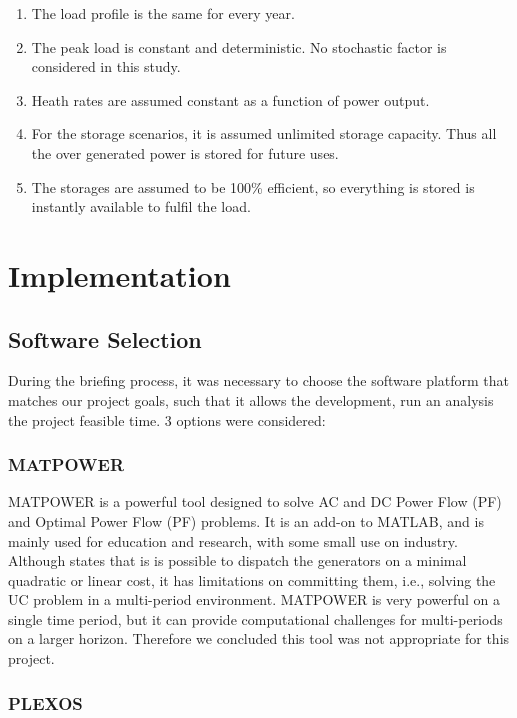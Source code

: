 \documentclass[12pt,LUDisStyle,twosided]{book}
\begin{document}
\begin{enumerate}
\item The load profile is the same for every year.
\item The peak load is constant and deterministic. No stochastic factor is considered in this study.
\item Heath rates are assumed constant as a function of power output.
\item For the storage scenarios, it is assumed unlimited storage capacity. Thus all the over generated power is stored for future uses.
\item The storages are assumed to be 100\% efficient, so everything is stored is instantly available to fulfil the load.
\end{enumerate}

\section{Implementation}


\subsection{Software Selection}

During the briefing process, it was necessary to choose the software platform that matches our project goals, such that it allows the development, run an analysis the project feasible time. 3 options were considered:

\subsubsection{MATPOWER}

MATPOWER is a powerful tool designed to solve AC and DC Power Flow (PF) and Optimal Power Flow (PF) problems. It is an add-on to MATLAB, and is mainly used for education and research, with some small use on industry. \cite{zimmerman} Although \citeauthor{zimmerman} states that is is possible to dispatch the generators on a minimal quadratic or linear cost, it has limitations on committing them, i.e., solving the UC problem in a multi-period environment. MATPOWER is very powerful on a single time period, but it can provide computational challenges for multi-periods on a larger horizon. Therefore we concluded this tool was not appropriate for this project.

\subsubsection{PLEXOS \textregistered }
\end{document}
